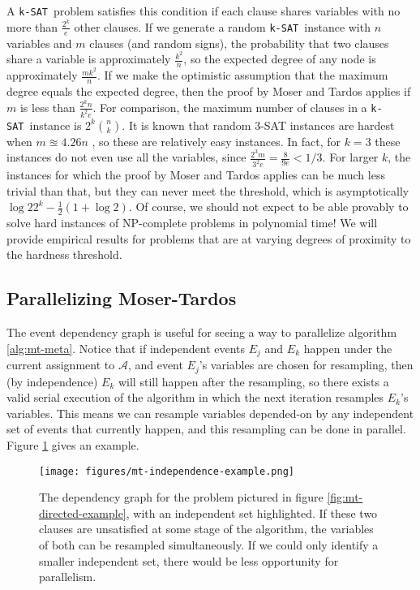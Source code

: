 \documentclass[twocolumn]{article}
\newcommand{\ksat}{\texttt{k-SAT}~}
\begin{document}
A \ksat problem satisfies this condition if each clause shares variables with no more than $\frac{2^k}{e}$ other clauses.  If we generate a random \ksat instance with $n$ variables and $m$ clauses (and random signs), the probability that two clauses share a variable is approximately $\frac{k^2}{n}$, so the expected degree of any node is approximately $\frac{m k^2}{n}$.  If we make the optimistic assumption that the maximum degree equals the expected degree, then the proof by Moser and Tardos applies if $m$ is less than $\frac{2^k n}{k^2 e}$.  For comparison, the maximum number of clauses in a \ksat instance is $2^k {n \choose k}$.  It is known that random 3-SAT instances are hardest when $m \approxeq 4.26 n$ \cite{gomes2008satisfiability}, so these are relatively easy instances.  In fact, for $k = 3$ these instances do not even use all the variables, since $\frac{2^3 m}{3^2 e} = \frac{8}{9e} < 1/3$.  For larger $k$, the instances for which the proof by Moser and Tardos applies can be much less trivial than that, but they can never meet the threshold, which is asymptotically $\log 2 2^k - \frac{1}{2}(1 + \log 2)$\cite{coja2014asymptotic}.  Of course, we should not expect to be able provably to solve hard instances of NP-complete problems in polynomial time!  We will provide empirical results for problems that are at varying degrees of proximity to the hardness threshold.

\subsection{Parallelizing Moser-Tardos}
The event dependency graph is useful for seeing a way to parallelize algorithm \ref{alg:mt-meta}.  Notice that if independent events $E_j$ and $E_k$ happen under the current assignment to $\mathcal{A}$, and event $E_j$'s variables are chosen for resampling, then (by independence) $E_k$ will still happen after the resampling, so there exists a valid serial execution of the algorithm in which the next iteration resamples $E_k$'s variables.  This means we can resample variables depended-on by any independent set of events that currently happen, and this resampling can be done in parallel.  Figure \ref{fig:mt-independence-example} gives an example.

\begin{figure}[ht]
  \texttt{[image: figures/mt-independence-example.png]}
  \caption{The dependency graph for the problem pictured in figure \ref{fig:mt-directed-example}, with an independent set highlighted.  If these two clauses are unsatisfied at some stage of the algorithm, the variables of both can be resampled simultaneously.  If we could only identify a smaller independent set, there would be less opportunity for parallelism.}
  \label{fig:mt-independence-example}
\end{figure}
\end{document}
